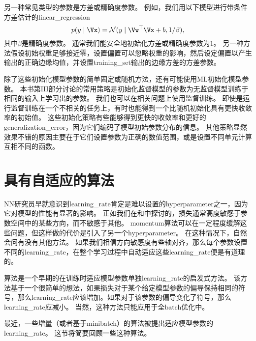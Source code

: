 另一种常见类型的参数是方差或精确度参数。
例如，我们用以下模型进行带条件方差估计的\gls{linear_regression}
\begin{equation}
    p(y\mid\Vx) = \mathcal{N} (y \mid \Vw^\top \Vx + b, 1/\beta) ,
\end{equation}
其中$\beta$是精确度参数。
通常我们能安全地初始化方差或精确度参数为$1$。
另一种方法假设初始权重足够接近零，设置偏置可以忽略权重的影响，然后设定偏置以产生输出的正确边缘均值，并设置\gls{training_set}输出的边缘方差的方差参数。


除了这些初始化模型参数的简单固定或随机方法，还有可能使用\gls{ML}初始化模型参数。
本书第III部分讨论的常用策略是初始化监督模型的参数为无监督模型训练于相同的输入上学习出的参数。
我们也可以在相关问题上使用监督训练。
即使是运行监督训练在一个不相关的任务上，有时也能得到一个比随机初始化具有更快收敛率的初始值。
这些初始化策略有些能够得到更快的收敛率和更好的\gls{generalization_error}，因为它们编码了模型初始参数分布的信息。
其他策略显然效果不错的原因主要在于它们设置参数为正确的数值范围，或是设置不同单元计算互相不同的函数。


\section{具有自适应的算法}
\label{sec:algorithms_with_adaptive_learning_rates}
\gls{NN}研究员早就意识到\gls{learning_rate}肯定是难以设置的\gls{hyperparameter}之一，因为它对模型的性能有显著的影响。
正如我们在和中探讨的，损失通常高度敏感于参数空间中的某些方向，而不敏感于其他。
\gls{momentum}算法可以在一定程度缓解这些问题，但这样做的代价是引入了另一个\gls{hyperparameter}。
在这种情况下，自然会问有没有其他方法。
如果我们相信方向敏感度有些轴对齐，那么每个参数设置不同的\gls{learning_rate}，在整个学习过程中自动适应这些\gls{learning_rate}便是有道理的。



算法\citep{jacobs1988}是一个早期的在训练时适应模型参数单独\gls{learning_rate}的启发式方法。
该方法基于一个很简单的想法，如果损失对于某个给定模型参数的偏导保持相同的符号，那么\gls{learning_rate}应该增加。如果对于该参数的偏导变化了符号，那么\gls{learning_rate}应减小。
当然，这种方法只能应用于全\gls{batch}优化中。


最近，一些增量（或者基于\gls{minibatch}）的算法被提出适应模型参数的\gls{learning_rate}。
这节将简要回顾一些这种算法。


